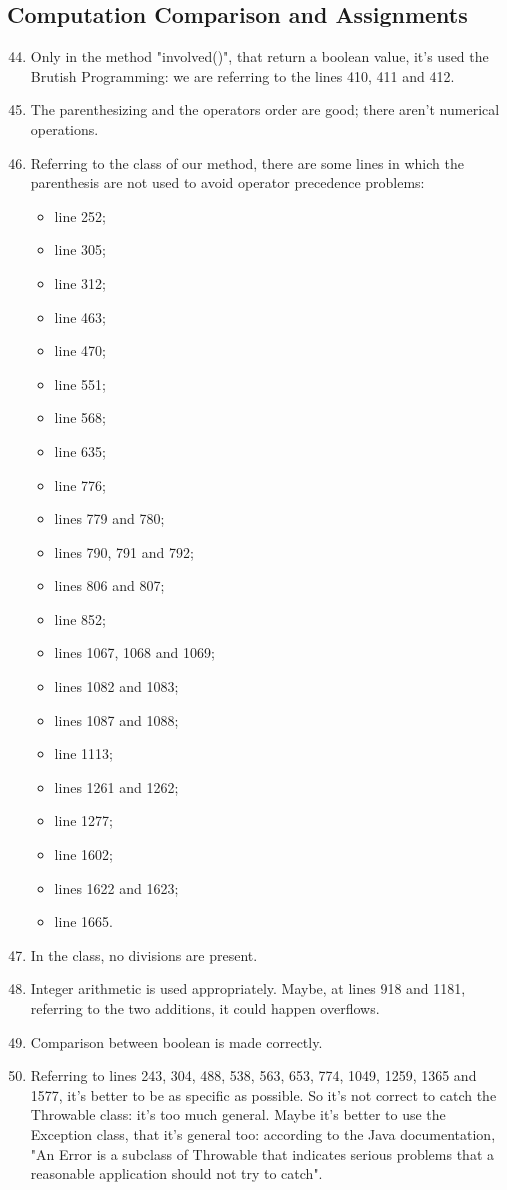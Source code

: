 \subsection{Computation Comparison and Assignments}
\begin{enumerate}
	\setcounter{enumi}{43}
	\item Only in the method "involved()", that return a boolean value, it's used the Brutish Programming: we are referring to the lines 410, 411 and 412.
	\item The parenthesizing and the operators order are good; there aren't numerical operations.
	\item Referring to the class of our method, there are some lines in which the parenthesis are not used to avoid operator precedence problems:
	    \begin{itemize}
	        \item line 252;
	        \item line 305;
	        \item line 312;
	        \item line 463;
	        \item line 470;
	        \item line 551;
	        \item line 568;
	        \item line 635;
	        \item line 776;
	        \item lines 779 and 780;
	        \item lines 790, 791 and 792;
	        \item lines 806 and 807;
	        \item line 852;
	        \item lines 1067, 1068 and 1069;
	        \item lines 1082 and 1083;
	        \item lines 1087 and 1088;
	        \item line 1113;
	        \item lines 1261 and 1262;
	        \item line 1277;
	        \item line 1602;
	        \item lines 1622 and 1623;
	        \item line 1665. 
	    \end{itemize}
	\item In the class, no divisions are present.
	\item Integer arithmetic is used appropriately. Maybe, at lines 918 and 1181, referring to the two additions, it could happen overflows.
	\item Comparison between boolean is made correctly.
	\item Referring to lines 243, 304, 488, 538, 563, 653, 774, 1049, 1259, 1365 and 1577, it's better to be as specific as possible. So it's not correct to catch the Throwable class: it's too much general. Maybe it's better to use the Exception class, that it's general too: according to the Java documentation, "An Error is a subclass of Throwable that indicates serious problems that a reasonable application should not try to catch". 
	

\end{enumerate}
